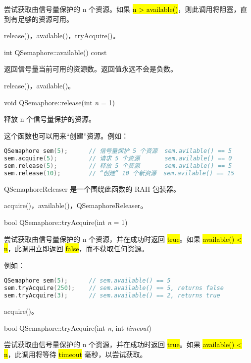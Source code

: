 尝试获取由信号量保护的 n 个资源。如果 \hl{n > available()}，则此调用将阻塞，直到有足够的资源可用。

\begin{seeAlso}
release()，available()，tryAcquire()。
\end{seeAlso}

int QSemaphore::available() const

返回信号量当前可用的资源数。返回值永远不会是负数。

\begin{seeAlso}
release()，available()。
\end{seeAlso}

void QSemaphore::release(int \emph{n} = 1)

释放 n 个信号量保护的资源。

这个函数也可以用来“创建”资源。例如：

\begin{lstlisting}[language=C++]
QSemaphore sem(5);      // 信号量保护 5 个资源  sem.avilable() == 5
sem.acquire(5);         // 请求 5 个资源       sem.avilable() == 0
sem.release(5);         // 释放 5 个资源       sem.avilable() == 5
sem.release(10);        // “创建” 10 个新资源  sem.avilable() == 15
\end{lstlisting}

QSemaphoreReleaser 是一个围绕此函数的 RAII 包装器。

\begin{seeAlso}
acquire()，available()，QSemaphoreReleaser。
\end{seeAlso}

bool QSemaphore::tryAcquire(int \emph{n} = 1)

尝试获取由信号量保护的 n 个资源，并在成功时返回 \hl{true}。如果 \hl{available() < n}，此调用立即返回 \hl{false}，而不获取任何资源。

例如：

\begin{lstlisting}[language=C++]
QSemaphore sem(5);      // sem.available() == 5
sem.tryAcquire(250);    // sem.available() == 5, returns false
sem.tryAcquire(3);      // sem.available() == 2, returns true
\end{lstlisting}

\begin{seeAlso}
acquire()。
\end{seeAlso}

bool QSemaphore::tryAcquire(int \emph{n}, int \emph{timeout})

尝试获取由信号量保护的 n 个资源，并在成功时返回 \hl{true}。如果 \hl{available() < n}，此调用将等待 \hl{timeout} 毫秒，以尝试获取。

